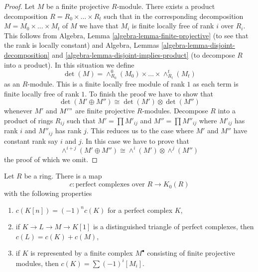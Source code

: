 \begin{proof}
Let $M$ be a finite projective $R$-module. There exists a product
decomposition $R = R_0 \times \ldots \times R_t$ such that
in the corresponding decomposition $M = M_0 \times \ldots \times M_t$
of $M$ we have that $M_i$ is finite locally free of rank $i$ over $R_i$.
This follows from Algebra, Lemma \ref{algebra-lemma-finite-projective}
(to see that the rank is locally constant) and
Algebra, Lemmas \ref{algebra-lemma-disjoint-decomposition} and
\ref{algebra-lemma-disjoint-implies-product} (to decompose
$R$ into a product). In this situation we define
$$
\det(M) = \wedge^0_{R_0}(M_0) \times \ldots \times \wedge^t_{R_t}(M_t)
$$
as an $R$-module. This is a finite locally free module of rank $1$
as each term is finite locally free of rank $1$. To finish the proof
we have to show that
$$
\det(M' \oplus M'') \cong \det(M') \otimes \det(M'')
$$
whenever $M'$ and $M'"$ are finite projective $R$-modules.
Decompose $R$ into a product of rings $R_{ij}$ such that
$M' = \prod M'_{ij}$ and $M'' = \prod M''_{ij}$ where
$M'_{ij}$ has rank $i$ and $M''_{ij}$ has rank $j$. This reduces
us to the case where $M'$ and $M''$ have constant rank say $i$ and $j$.
In this case we have to prove that
$$
\wedge^{i + j}(M' \oplus M'') \cong \wedge^i(M') \otimes \wedge^j(M'')
$$
the proof of which we omit.
\end{proof}

\begin{lemma}
\label{lemma-perfect-to-K-group}
Let $R$ be a ring. There is a map
$$
c : \text{perfect complexes over }R \longrightarrow K_0(R)
$$
with the following properties
\begin{enumerate}
\item $c(K[n]) = (-1)^nc(K)$ for a perfect complex $K$,
\item if $K \to L \to M \to K[1]$ is a distinguished triangle of
perfect complexes, then $c(L) = c(K) + c(M)$,
\item if $K$ is represented by a finite complex $M^\bullet$
consisting of finite projective modules, then
$c(K) = \sum (-1)^i[M_i]$.
\end{enumerate}
\end{lemma}

